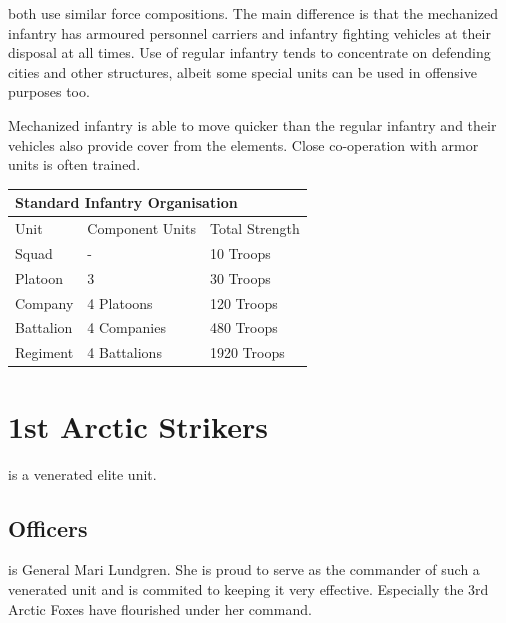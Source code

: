 \documentclass{tufte-book}
\begin{document}
 both use similar force
compositions. The main difference is that the mechanized infantry has
armoured personnel carriers and infantry fighting vehicles at their
disposal at all times. Use of regular infantry tends to concentrate on
defending cities and other structures, albeit some special units can be
used in offensive purposes too.

Mechanized infantry is able to move quicker than the regular infantry
and their vehicles also provide cover from the elements. Close
co-operation with armor units is often trained.

\bigskip
\begin{minipage}{\textwidth}
\begin{center}
\begin{tabular}{lll}
\toprule
\multicolumn{3}{l}{Standard Infantry Organisation} \\
\midrule
Unit & Component Units & Total Strength \\
\midrule
Squad     & -            & 10 Troops \\
Platoon   & 3            & 30 Troops \\
Company   & 4 Platoons   & 120 Troops \\
Battalion & 4 Companies  & 480 Troops \\
Regiment  & 4 Battalions & 1920 Troops \\
\bottomrule
\end{tabular}
\end{center}
\end{minipage}

\section{1st Arctic Strikers}

 is a venerated elite unit. 

\subsection{Officers}

 is General Mari Lundgren.
She is proud to serve as the commander of such a venerated unit and is
commited to keeping it very effective. Especially the 3rd Arctic
Foxes have flourished under her command.
\end{document}
